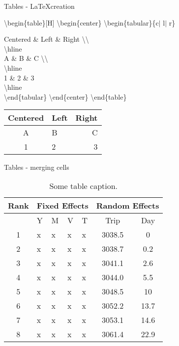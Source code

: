 \documentclass[xcolor=dvipsnames]{beamer}
\begin{document}
\begin{frame}{\LARGE{Tables - \LaTeX creation}}
  
\textbackslash begin\{table\}[H]    
    \textbackslash begin\{center\}
  		 \textbackslash begin\{tabular\}\{c$\vert$ l$\vert$ r\} 
  		 
  Centered \& Left \& Right \textbackslash \textbackslash ~\\
  \textbackslash hline ~\\
	A  \& B \& C \textbackslash \textbackslash ~\\
	\textbackslash hline ~\\
	 1 \& 2 \& 3 ~\\
	\textbackslash hline ~\\
  \textbackslash end\{tabular\}
   		\textbackslash end\{center\}
			\textbackslash end\{table\} 
  
    
\begin{table}[H]    
    \begin{center}
  		\begin{tabular}{c|l|r}
  Centered & Left & Right \\
  \hline
	A  & B & C \\
	\hline
	 1 & 2 & 3\\
	\hline
  \end{tabular}
   		\end{center}
			\end{table}

\end{frame}


\begin{frame}{\LARGE{Tables - merging cells}}

\begin{table}[H]
	\begin{tabular}{c|llll|cc}
	\hline
	\textbf{Rank} &	\multicolumn{4}{c|}{\textbf{Fixed Effects}} & \multicolumn{2}{c}{\textbf{Random Effects}}\\
	\hline
	& Y & M & V & T & Trip & Day \\
	\hline\hline
	1 & x & x & x & x & 3038.5 & 0\\
	2 & x & x & x & x &  3038.7 & 0.2\\
	3 & x & x & x & x & 3041.1 & 2.6\\
	4 & x & x & x & x & 3044.0 & 5.5\\
	5 & x & x & x & x  & 3048.5 & 10\\
	6 & x & x & x & x  & 3052.2 & 13.7\\
	7 & x & x & x & x  & 3053.1 & 14.6\\
	8 & x & x & x & x  & 3061.4 & 22.9\\
		\hline
\end{tabular} 
\caption{Some table caption.}
\end{table}
\end{frame}
\end{document}

